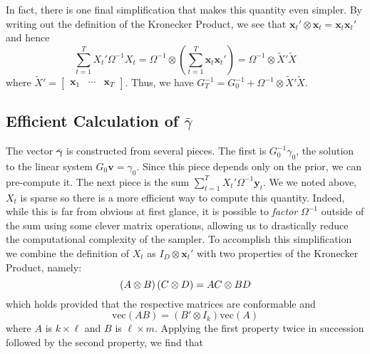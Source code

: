 \documentclass[12pt]{article}
\begin{document}
In fact, there is one final simplification that makes this quantity even simpler. 
By writing out the definition of the Kronecker Product, we see that $\mathbf{x}_t' \otimes \mathbf{x}_t = \mathbf{x}_t \mathbf{x}_t'$
and hence
\begin{equation*}
  \sum_{t=1}^{T} X_t' \Omega^{-1} X_t = \Omega^{-1} \otimes \left( \sum_{t=1}^T \mathbf{x}_t \mathbf{x}_t' \right) = \Omega^{-1} \otimes \widetilde{X}' \widetilde{X}
\end{equation*}
where $\widetilde{X}' = \left[
\begin{array}{ccc}
  \mathbf{x}_1 & \cdots & \mathbf{x}_T
\end{array}
\right]$.
Thus, we have $G_T^{-1} = G_{0}^{-1} + \Omega^{-1} \otimes \widetilde{X}'\widetilde{X}$.

\subsection{Efficient Calculation of $\bar{\gamma}$}
The vector $\bar{\boldsymbol{\gamma}}$ is constructed from several pieces.
The first is $G_0^{-1} \gamma_0$, the solution to the linear system $G_0
\mathbf{v} = \gamma_0$.
Since this piece depends only on the prior, we can pre-compute it.
The next piece is the sum $\sum_{t=1}^{T} X_t' \Omega^{-1} \mathbf{y}_t$.
We we noted above, $X_t$ is sparse so there is a more efficient way to compute this quantity.
Indeed, while this is far from obvious at first glance, it is possible to \emph{factor} $\Omega^{-1}$ outside of the sum using some clever matrix operations, allowing us to drastically reduce the computational complexity of the sampler.
To accomplish this simplification we combine the definition of $X_t$ as $I_D \otimes \mathbf{x}_t'$ with two properties of the Kronecker Product, namely:
\begin{equation*}
  \left( A \otimes B \right)\left( C \otimes D \right) =  AC \otimes BD\\
\end{equation*}
which holds provided that the respective matrices are conformable and
\begin{equation*}
  \mbox{vec}\left( AB \right) = \left( B' \otimes I_k \right) \mbox{vec}(A)
\end{equation*}
where $A$ is $k\times \ell$ and $B$ is $\ell \times m$.
Applying the first property twice in succession followed by the second property, we find that
\end{document}
